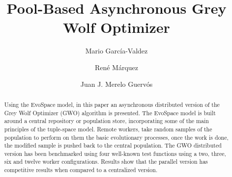 \documentclass{llncs}
\begin{document}
\sloppy

\title{Pool-Based Asynchronous Grey Wolf Optimizer}

\author{Mario Garc\'ia-Valdez \and Ren\'e M\'arquez \and Juan J. Merelo Guerv\'os}


\maketitle

\begin{abstract}
 

    Using the EvoSpace model, in this paper an asynchronous distributed version of 
    the Grey Wolf Optimizer (GWO) algorithm is presented. The EvoSpace model is
    built around a central repository or population store, incorporating some of 
    the main principles of the tuple-space model. Remote workers,
	take random samples of the population to perform on them the basic evolutionary
	processes, once the work is done, the modified sample is pushed back to the 
	central population. The GWO distributed version has been benchmarked using 
	four well-known test functions using a two, three, six and twelve worker configurations. 
	Results show that the parallel version has competitive results when compared 
	to a centralized version.   

	


	



\end{abstract}
\end{document}
